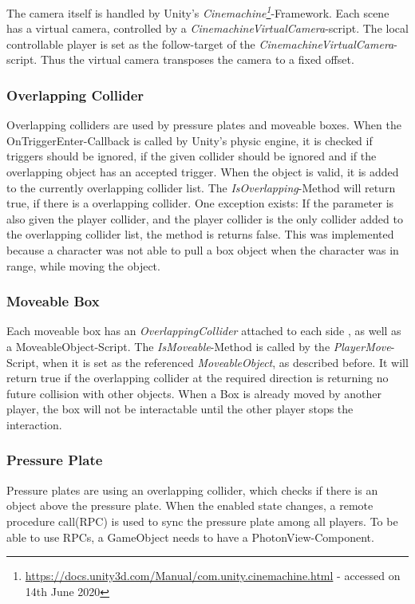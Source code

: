 The camera itself is handled by Unity's \textit{Cinemachine\footnote{\url{https://docs.unity3d.com/Manual/com.unity.cinemachine.html} - accessed on 14th June 2020}}-Framework.
Each scene has a virtual camera, controlled by a \textit{CinemachineVirtualCamera}-script. The local controllable player is set as the follow-target of the \textit{CinemachineVirtualCamera}-script.
Thus the virtual camera transposes the camera to a fixed offset.

\subsubsection{Overlapping Collider}

Overlapping colliders are used by pressure plates and moveable boxes.
When the OnTriggerEnter-Callback is called by Unity's physic engine, it is checked if triggers should be ignored, if the given collider should be ignored and if the overlapping object has an accepted trigger.
When the object is valid, it is added to the currently overlapping collider list. The \textit{IsOverlapping}-Method will return true, if there is a overlapping collider.
One exception exists: If the parameter is also given the player collider, and the player collider is the only collider added to the overlapping collider list, the method is returns false. This was implemented because a character was not able to pull a box object when the character was in range, while moving the object.

\subsubsection{Moveable Box}

Each moveable box has an \textit{OverlappingCollider} attached to each side , as well as a MoveableObject-Script. The \textit{IsMoveable}-Method is called by the \textit{PlayerMove}-Script, when it is set as the referenced \textit{MoveableObject}, as described before. It will return true if the overlapping collider at the required direction is returning no future collision with other objects.
When a Box is already moved by another player, the box will not be interactable until the other player stops the interaction.

\subsubsection{Pressure Plate}

Pressure plates are using an overlapping collider, which checks if there is an object above the pressure plate.
When the enabled state changes, a remote procedure call(RPC) is used to sync the pressure plate among all players.
To be able to use RPCs, a GameObject needs to have a PhotonView-Component.

